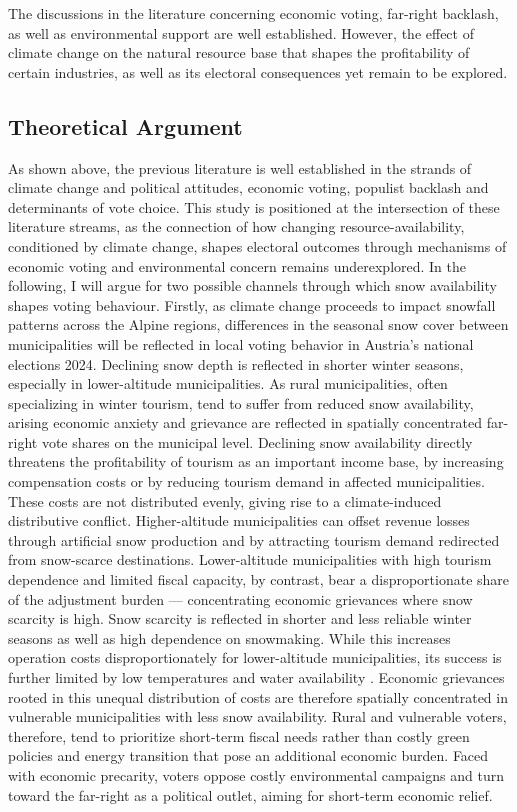 \documentclass{article}
\begin{document}
The discussions in the literature concerning economic voting, far-right backlash, as well as environmental support are well established. However, the effect of climate change on the natural resource base that shapes the profitability of certain industries, as well as its electoral consequences yet remain to be explored. 


\subsection{Theoretical Argument}
As shown above, the previous literature is well established in the strands of climate change and political attitudes, economic voting, populist backlash and determinants of vote choice. This study is positioned at the intersection of these literature streams, as the connection of how changing resource-availability, conditioned by climate change, shapes electoral outcomes through mechanisms of economic voting and environmental concern remains underexplored.
In the following, I will argue for two possible channels through which snow availability shapes voting behaviour.
Firstly, as climate change proceeds to impact snowfall patterns across the Alpine regions, differences in the seasonal snow cover between municipalities will be reflected in local voting behavior in Austria's national elections 2024. Declining snow depth is reflected in shorter winter seasons, especially in lower-altitude municipalities. As rural municipalities, often specializing in winter tourism, tend to suffer from reduced snow availability, arising economic anxiety and grievance are reflected in spatially concentrated far-right vote shares on the municipal level. Declining snow availability directly threatens the profitability of tourism as an important income base, by increasing compensation costs or by reducing tourism demand in affected municipalities. These costs are not distributed evenly, giving rise to a climate-induced distributive conflict. Higher-altitude municipalities can offset revenue losses through artificial snow production and by attracting tourism demand redirected from snow-scarce destinations. Lower-altitude municipalities with high tourism dependence and limited fiscal capacity, by contrast, bear a disproportionate share of the adjustment burden — concentrating economic grievances where snow scarcity is high. Snow scarcity is reflected in shorter and less reliable winter seasons as well as high dependence on snowmaking. While this increases operation costs disproportionately for lower-altitude municipalities, its success is further limited by low temperatures and water availability \parencite{Steiger2013}. Economic grievances rooted in this unequal distribution of costs are therefore spatially concentrated in vulnerable municipalities with less snow availability. Rural and vulnerable voters, therefore, tend to prioritize short-term fiscal needs rather than costly green policies and energy transition that pose an additional economic burden. Faced with economic precarity, voters oppose costly environmental campaigns and turn toward the far-right as a political outlet, aiming for short-term economic relief. 
\end{document}
